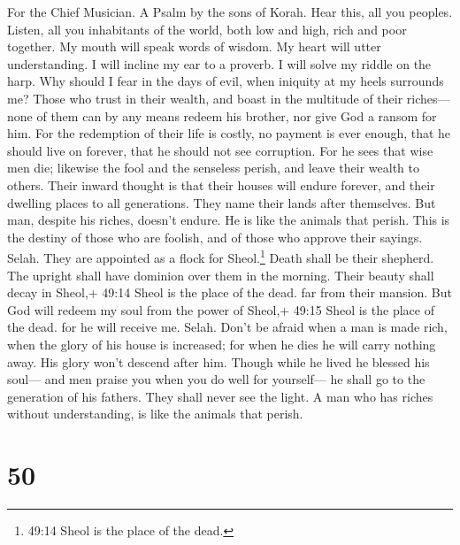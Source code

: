 For the Chief Musician. A Psalm by the sons of Korah.  Hear
this, all you peoples. Listen, all you inhabitants of the world,
 both low and high, rich and poor together.  My
mouth will speak words of wisdom. My heart will utter understanding.
 I will incline my ear to a proverb. I will solve my riddle
on the harp.  Why should I fear in the days of evil, when
iniquity at my heels surrounds me?  Those who trust in their
wealth, and boast in the multitude of their riches---  none
of them can by any means redeem his brother, nor give God a ransom for
him.  For the redemption of their life is costly, no payment
is ever enough,  that he should live on forever, that he
should not see corruption.  For he sees that wise men die;
likewise the fool and the senseless perish, and leave their wealth to
others.  Their inward thought is that their houses will
endure forever, and their dwelling places to all generations. They name
their lands after themselves.  But man, despite his riches,
doesn't endure. He is like the animals that perish.  This
is the destiny of those who are foolish, and of those who approve their
sayings. Selah.  They are appointed as a flock for
Sheol.\footnote{49:14 Sheol is the place of the dead.} Death shall be
their shepherd. The upright shall have dominion over them in the
morning. Their beauty shall decay in Sheol,+ 49:14 Sheol is the place of
the dead. far from their mansion.  But God will redeem my
soul from the power of Sheol,+ 49:15 Sheol is the place of the dead. for
he will receive me. Selah.  Don't be afraid when a man is
made rich, when the glory of his house is increased;  for
when he dies he will carry nothing away. His glory won't descend after
him.  Though while he lived he blessed his soul--- and men
praise you when you do well for yourself---  he shall go to
the generation of his fathers. They shall never see the light.
 A man who has riches without understanding, is like the
animals that perish.

\hypertarget{section-49}{%
\section{50}\label{section-49}}

